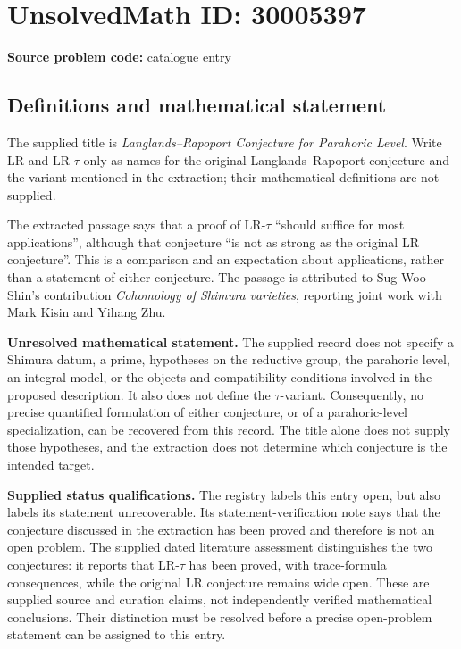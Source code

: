 \documentclass[11pt]{article}
\begin{document}
\section*{UnsolvedMath ID: 30005397}
\textbf{Source problem code:} catalogue entry
\subsection{Definitions and mathematical statement}
The supplied title is \emph{Langlands--Rapoport Conjecture for Parahoric Level}. Write \(\mathrm{LR}\) and \(\mathrm{LR}\text{-}\tau\) only as names for the original Langlands--Rapoport conjecture and the variant mentioned in the extraction; their mathematical definitions are not supplied.

The extracted passage says that a proof of \(\mathrm{LR}\text{-}\tau\) ``should suffice for most applications'', although that conjecture ``is not as strong as the original LR conjecture''. This is a comparison and an expectation about applications, rather than a statement of either conjecture. The passage is attributed to Sug Woo Shin's contribution \emph{Cohomology of Shimura varieties}, reporting joint work with Mark Kisin and Yihang Zhu.

\textbf{Unresolved mathematical statement.} The supplied record does not specify a Shimura datum, a prime, hypotheses on the reductive group, the parahoric level, an integral model, or the objects and compatibility conditions involved in the proposed description. It also does not define the \(\tau\)-variant. Consequently, no precise quantified formulation of either conjecture, or of a parahoric-level specialization, can be recovered from this record. The title alone does not supply those hypotheses, and the extraction does not determine which conjecture is the intended target.

\textbf{Supplied status qualifications.} The registry labels this entry open, but also labels its statement unrecoverable. Its statement-verification note says that the conjecture discussed in the extraction has been proved and therefore is not an open problem. The supplied dated literature assessment distinguishes the two conjectures: it reports that \(\mathrm{LR}\text{-}\tau\) has been proved, with trace-formula consequences, while the original \(\mathrm{LR}\) conjecture remains wide open. These are supplied source and curation claims, not independently verified mathematical conclusions. Their distinction must be resolved before a precise open-problem statement can be assigned to this entry.
\end{document}
